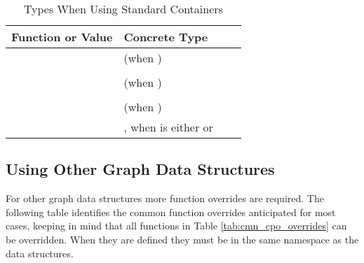 \begin{table}[h!]
    \begin{center}
    \resizebox{\textwidth}{!}
    {\begin{tabular}{l l p{1.5cm} L{7.0cm}}
    \hline
        \textbf{Function or Value} & \textbf{Concrete Type} \\
    \hline
         &  (when ) \\
         &  & \\
         &  (when ) \\
         &  & \\
         &  (when ) \\
         & , when  is either   or  \\
    \hline
    \end{tabular}}
    \caption{Types When Using Standard Containers}
    \label{tab:simple_graph}
    \end{center}
\end{table}


\subsection{Using Other Graph Data Structures}
For other graph data structures more function overrides are required. The following table identifies the common function
overrides anticipated for most cases, keeping in mind that all functions in Table \ref{tab:cmn_cpo_overrides} can be overridden.
When they are defined they must be in the same namespace as the data structures.

